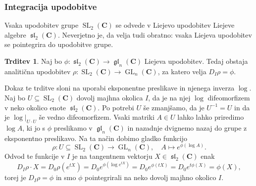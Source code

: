 \documentclass[11pt]{book}
\def\CC{\mathbf{C}}
\DeclareMathOperator\GL{GL}
\DeclareMathOperator\glfrak{\mathfrak{gl}}
\DeclareMathOperator\slfrak{\mathfrak{sl}}
\DeclareMathOperator\SL{SL}
\theoremstyle{definition}
\theoremstyle{zgled}
\theoremstyle{odprtproblem}
\theoremstyle{domacanaloga}
\theoremstyle{izrek}
\newtheorem*{trditev}{Trditev}
\begin{document}
\subsubsection{Integracija upodobitve}

Vsaka upodobitev grupe $\SL_2(\CC)$ se odvede v Liejevo upodobitev Liejeve algebre $\slfrak_2(\CC)$. Neverjetno je, da velja tudi obratno: vsaka Liejeva upodobitev se pointegrira do upodobitve grupe.

\begin{trditev}
Naj bo $\phi \colon \slfrak_2(\CC) \to \glfrak_n(\CC)$ Liejeva upodobitev. Tedaj obstaja analitična upodobitev $\rho \colon \SL_2(\CC) \to \GL_n(\CC)$, za katero velja $D_I \rho = \phi$.
\end{trditev}

Dokaz te trditve sloni na uporabi eksponentne preslikave in njenega inverza $\log$. Naj bo $U \subseteq \SL_2(\CC)$ dovolj majhna okolica $I$, da je na njej $\log$ difeomorfizem v neko okolico enote $\slfrak_2(\CC)$. Po potrebi $U$ še zmanjšamo, da je $U^{-1} = U$ in da je $\log |_{U \cdot U}$ še vedno difeomorfizem. Vsaki matriki $A \in U$ lahko lahko priredimo $\log A$, ki jo s $\phi$ preslikamo v $\glfrak_n(\CC)$ in nazadnje dvignemo nazaj do grupe z eksponentno preslikavo. Na ta način dobimo gladko funkcijo
\[
    \textstyle \rho \colon U \subseteq \SL_2(\CC) \to \GL_n(\CC), \quad
    A \mapsto e^{\phi(\log A)}.
\]
Odvod te funkcije v $I$ je na tangentnem vektorju $X \in \slfrak_2(\CC)$ enak
\[
    \textstyle D_I \rho \cdot X
    = D_0 \rho(e^{tX})
    = D_0 e^{\phi(\log e^{tX})}
    = D_0 e^{\phi(tX)}
    = D_0 e^{t \phi(X)}
    = \phi(X),
\]
torej je $D_I \rho = \phi$ in smo $\phi$ pointegrirali na neko dovolj majhno okolico $I$. 
\end{document}
